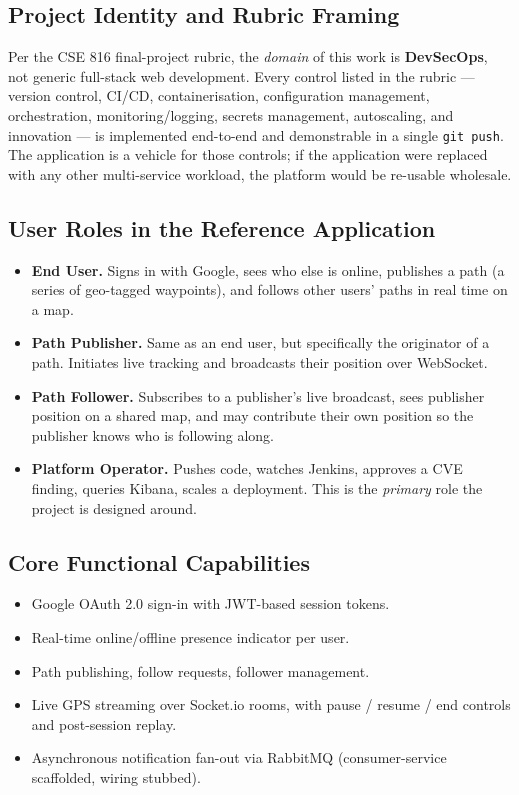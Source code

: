 \documentclass[11pt,a4paper]{article}
\begin{document}
\subsection{Project Identity and Rubric Framing}
Per the CSE 816 final-project rubric, the \emph{domain} of this work is
\textbf{DevSecOps}, not generic full-stack web development.  Every
control listed in the rubric — version control, CI/CD, containerisation,
configuration management, orchestration, monitoring/logging, secrets
management, autoscaling, and innovation — is implemented end-to-end and
demonstrable in a single \texttt{git push}.  The application is a
vehicle for those controls; if the application were replaced with any
other multi-service workload, the platform would be re-usable wholesale.

\subsection{User Roles in the Reference Application}
\begin{itemize}[leftmargin=*]
  \item \textbf{End User.}  Signs in with Google, sees who else is
        online, publishes a path (a series of geo-tagged waypoints),
        and follows other users' paths in real time on a map.
  \item \textbf{Path Publisher.}  Same as an end user, but specifically
        the originator of a path.  Initiates live tracking and
        broadcasts their position over WebSocket.
  \item \textbf{Path Follower.}  Subscribes to a publisher's live
        broadcast, sees publisher position on a shared map, and may
        contribute their own position so the publisher knows who is
        following along.
  \item \textbf{Platform Operator.}  Pushes code, watches Jenkins,
        approves a CVE finding, queries Kibana, scales a deployment.
        This is the \emph{primary} role the project is designed around.
\end{itemize}

\subsection{Core Functional Capabilities}
\begin{itemize}[leftmargin=*]
  \item Google OAuth 2.0 sign-in with JWT-based session tokens.
  \item Real-time online/offline presence indicator per user.
  \item Path publishing, follow requests, follower management.
  \item Live GPS streaming over Socket.io rooms, with pause / resume
        / end controls and post-session replay.
  \item Asynchronous notification fan-out via RabbitMQ
        (consumer-service scaffolded, wiring stubbed).
\end{itemize}
\end{document}
